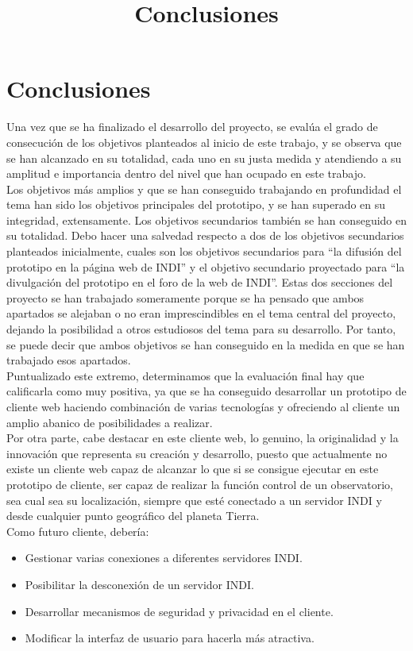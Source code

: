\chapter{Conclusiones}
\title{Conclusiones}
\label{cap:Conclusiones}

Una vez que se ha finalizado el desarrollo del proyecto, se evalúa el grado de consecución de los objetivos planteados  al inicio de este trabajo, y se observa que se han alcanzado en su totalidad, cada uno en su justa medida y atendiendo a su amplitud e importancia dentro del nivel que han ocupado en este trabajo. \\

Los objetivos más amplios y que se han conseguido trabajando en profundidad el tema han sido los objetivos principales del prototipo, y se han superado en su integridad, extensamente.
Los objetivos secundarios también se han conseguido en su totalidad. Debo hacer una salvedad respecto a dos de los objetivos secundarios planteados inicialmente, cuales son los objetivos secundarios para “la difusión del prototipo en la página web de INDI” y el objetivo secundario proyectado para “la divulgación del prototipo en el foro de la web de INDI”. Estas dos secciones del proyecto se han trabajado someramente porque se ha pensado que ambos apartados se alejaban o no eran imprescindibles en el tema central del proyecto, dejando la posibilidad a otros estudiosos del tema para su desarrollo. Por tanto, se puede decir que ambos objetivos se han conseguido en la medida en que se han trabajado esos apartados.\\

Puntualizado este extremo, determinamos que la evaluación final hay que calificarla como muy positiva, ya que se ha conseguido desarrollar un prototipo de cliente web haciendo combinación de varias tecnologías y ofreciendo al cliente un amplio abanico de posibilidades a realizar.\\

Por otra parte, cabe destacar en este cliente web, lo genuino, la originalidad y la innovación que representa su creación y desarrollo, puesto que actualmente no existe un cliente web capaz de alcanzar lo que si se consigue ejecutar en este prototipo de cliente, ser  capaz de realizar la función control de un observatorio, sea cual sea su localización, siempre que esté conectado a un servidor INDI y desde cualquier punto geográfico del planeta Tierra.\\

Como futuro cliente, debería:
\begin{itemize}
  \item Gestionar varias conexiones a diferentes servidores INDI.
  \item Posibilitar la desconexión de un servidor INDI.
  \item Desarrollar mecanismos de seguridad y privacidad en el cliente.
  \item Modificar la interfaz de usuario para hacerla más atractiva.
\end{itemize}

